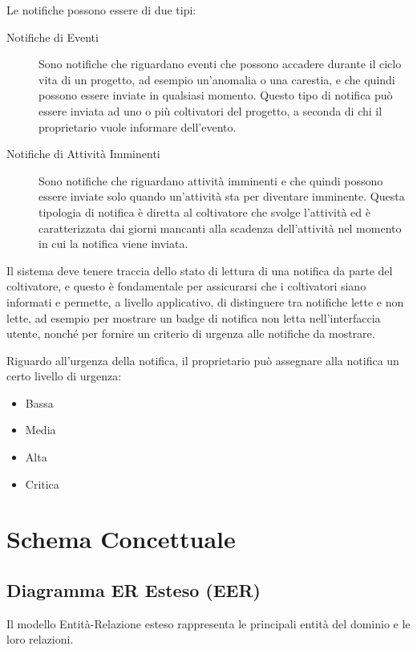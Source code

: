 \documentclass[12pt,a4paper]{article}
\begin{document}
Le notifiche possono essere di due tipi:

\begin{description}
    \item[Notifiche di Eventi] Sono notifiche che riguardano eventi che possono accadere durante il ciclo vita di un progetto, ad esempio un'anomalia o una carestia, e che quindi possono essere inviate in qualsiasi momento. Questo tipo di notifica può essere inviata ad uno o più coltivatori del progetto, a seconda di chi il proprietario vuole informare dell'evento.
    
    \item[Notifiche di Attività Imminenti] Sono notifiche che riguardano attività imminenti e che quindi possono essere inviate solo quando un'attività sta per diventare imminente. Questa tipologia di notifica è diretta al coltivatore che svolge l'attività ed è caratterizzata dai giorni mancanti alla scadenza dell'attività nel momento in cui la notifica viene inviata.
\end{description}

Il sistema deve tenere traccia dello stato di lettura di una notifica da parte del coltivatore, e questo è fondamentale per assicurarsi che i coltivatori siano informati e permette, a livello applicativo, di distinguere tra notifiche lette e non lette, ad esempio per mostrare un badge di notifica non letta nell'interfaccia utente, nonché per fornire un criterio di urgenza alle notifiche da mostrare.

Riguardo all'urgenza della notifica, il proprietario può assegnare alla notifica un certo livello di urgenza:

\begin{itemize}
    \item Bassa
    \item Media
    \item Alta
    \item Critica
\end{itemize}

\newpage

\section{Schema Concettuale}

\subsection{Diagramma ER Esteso (EER)}

Il modello Entità-Relazione esteso rappresenta le principali entità del dominio e le loro relazioni.
\end{document}
